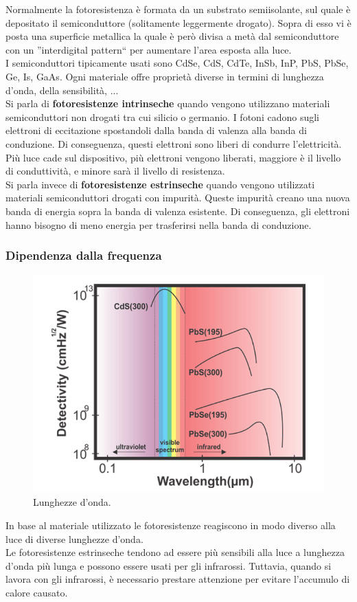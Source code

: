 \documentclass[12pt,oneside,a4paper]{article}
\begin{document}
Normalmente la fotoresistenza è formata da un substrato semiisolante, sul quale è depositato il semiconduttore (solitamente leggermente drogato). Sopra di esso vi è posta una superficie metallica la quale è però divisa a metà dal semiconduttore con un ''interdigital pattern`` per aumentare l'area esposta alla luce.
\\I semiconduttori tipicamente usati sono CdSe, CdS, CdTe, InSb, InP, PbS, PbSe, Ge, Is, GaAs. Ogni materiale offre proprietà diverse in termini di lunghezza d'onda, della sensibilità, ...
\\Si parla di \textbf{fotoresistenze intrinseche} quando vengono utilizzano materiali semiconduttori non drogati tra cui silicio o germanio. I fotoni cadono sugli elettroni di eccitazione spostandoli dalla banda di valenza alla banda di conduzione. Di conseguenza, questi elettroni sono liberi di condurre l'elettricità.
\\Più luce cade sul dispositivo, più elettroni vengono liberati, maggiore è il livello di conduttività, e minore sarà il livello di resistenza.
\\Si parla invece di \textbf{fotoresistenze estrinseche} quando vengono utilizzati materiali semiconduttori drogati con impurità. Queste impurità creano una nuova banda di energia sopra la banda di valenza esistente. Di conseguenza, gli elettroni hanno bisogno di meno energia per trasferirsi nella banda di conduzione.


\subsubsection{Dipendenza dalla frequenza}
\begin{figure}[!htb]
    \centering
    \includegraphics[width=0.6\linewidth]{figures/frequenza.png}
    \caption{Lunghezze d'onda.}
\end{figure}
In base al materiale utilizzato le fotoresistenze reagiscono in modo diverso alla luce di diverse lunghezze d'onda.
\\Le fotoresistenze estrinseche tendono ad essere più sensibili alla luce a lunghezza d'onda più lunga e possono essere usati per gli infrarossi. Tuttavia, quando si lavora con gli infrarossi, è necessario prestare attenzione per evitare l'accumulo di calore causato.
\end{document}
